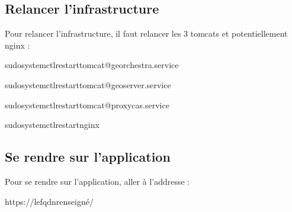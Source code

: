 \documentclass[letterpaper,10pt,french]{sphinxmanual}
\begin{document}
\subsection{Relancer l’infrastructure}
\label{\detokenize{doc_instal/installation:relancer-l-infrastructure}}
\sphinxAtStartPar
Pour relancer l’infrastructure, il faut relancer les 3 tomcats et potentiellement nginx :

\begin{sphinxVerbatim}[commandchars=\\\{\}]
sudosystemctlrestarttomcat@georchestra.service
\end{sphinxVerbatim}

\begin{sphinxVerbatim}[commandchars=\\\{\}]
sudosystemctlrestarttomcat@geoserver.service
\end{sphinxVerbatim}

\begin{sphinxVerbatim}[commandchars=\\\{\}]
sudosystemctlrestarttomcat@proxycas.service
\end{sphinxVerbatim}

\begin{sphinxVerbatim}[commandchars=\\\{\}]
sudosystemctlrestartnginx
\end{sphinxVerbatim}


\subsection{Se rendre sur l’application}
\label{\detokenize{doc_instal/installation:se-rendre-sur-l-application}}
\sphinxAtStartPar
Pour se rendre sur l’application, aller à l’addresse :

\begin{sphinxVerbatim}[commandchars=\\\{\}]
https://le\PYGZus{}fqdn\PYGZus{}renseigné/
\end{sphinxVerbatim}

\sphinxstepscope
\end{document}
